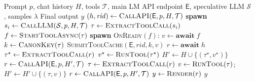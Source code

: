 \begin{algorithm}[h]
\caption{Client with Speculative Tool Execution and Cache Submission}
\label{alg:client-speculative}
\begin{algorithmic}[1]

\Require Prompt $p$, chat history $H$, tools $\mathcal{T}$, main LM API endpoint $\mathsf{E}$, speculative LLM $\mathcal{S}$, samples $\lambda$
\Ensure Final output $y$
\State $(h, \mathit{rid}) \gets \textsc{CallAPI}(\mathsf{E}, p, H, \mathcal{T})$ 
 
  \State \textbf{spawn} $s_i \gets \textsc{CallLLM}(\mathcal{S}, p, H, \mathcal{T})$
    \State $\tau \gets \textsc{ExtractToolCall}(s_i)$
    \State $f \gets \textsc{StartToolAsync}(\tau)$
    \State \textbf{spawn} \textsc{OnReady}$(f)$:
    \Statex \hspace{4em} $v \gets \textbf{await}\; f$
    \Statex \hspace{4em} $k \gets \textsc{CanonKey}(\tau)$ 
    \Statex \hspace{4em} \textsc{SubmitToolCache}$(\mathsf{E}, \mathit{rid}, k, v)$
  \EndIf
\EndFor
\State
\State $r \gets \textbf{await}\; h$ 
\State
{}
  \State $\tau^\star \gets \textsc{ExtractToolCall}(r)$
  \State $v^\star \gets \textsc{RunTool}(\tau^\star)$
  \State $H' \gets H \cup \{(\tau^\star, v^\star)\}$
  \State $r \gets \textsc{CallAPI}(\mathsf{E}, p, H', \mathcal{T})$ 
    \State $\tau \gets \textsc{ExtractToolCall}(r)$
    \State $v \gets \textsc{RunTool}(\tau)$; $H' \gets H' \cup \{(\tau, v)\}$
    \State  $r \gets \textsc{CallAPI}(\mathsf{E}, p, H', \mathcal{T})$
  \EndWhile
\EndIf
\State $y \gets \textsc{Render}(r)$
\State \Return $y$
\end{algorithmic}
\end{algorithm}

